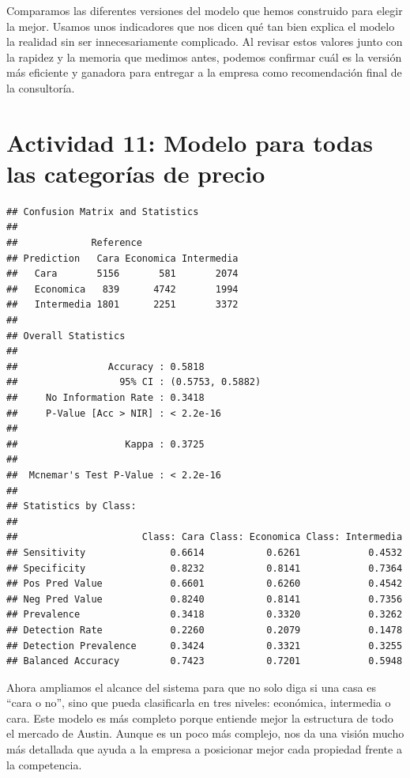 \documentclass[
]{article}
\begin{document}
Comparamos las diferentes versiones del modelo que hemos construido para
elegir la mejor. Usamos unos indicadores que nos dicen qué tan bien
explica el modelo la realidad sin ser innecesariamente complicado. Al
revisar estos valores junto con la rapidez y la memoria que medimos
antes, podemos confirmar cuál es la versión más eficiente y ganadora
para entregar a la empresa como recomendación final de la consultoría.

\section{Actividad 11: Modelo para todas las categorías de
precio}\label{actividad-11-modelo-para-todas-las-categoruxedas-de-precio}

\begin{verbatim}
## Confusion Matrix and Statistics
## 
##             Reference
## Prediction   Cara Economica Intermedia
##   Cara       5156       581       2074
##   Economica   839      4742       1994
##   Intermedia 1801      2251       3372
## 
## Overall Statistics
##                                           
##                Accuracy : 0.5818          
##                  95% CI : (0.5753, 0.5882)
##     No Information Rate : 0.3418          
##     P-Value [Acc > NIR] : < 2.2e-16       
##                                           
##                   Kappa : 0.3725          
##                                           
##  Mcnemar's Test P-Value : < 2.2e-16       
## 
## Statistics by Class:
## 
##                      Class: Cara Class: Economica Class: Intermedia
## Sensitivity               0.6614           0.6261            0.4532
## Specificity               0.8232           0.8141            0.7364
## Pos Pred Value            0.6601           0.6260            0.4542
## Neg Pred Value            0.8240           0.8141            0.7356
## Prevalence                0.3418           0.3320            0.3262
## Detection Rate            0.2260           0.2079            0.1478
## Detection Prevalence      0.3424           0.3321            0.3255
## Balanced Accuracy         0.7423           0.7201            0.5948
\end{verbatim}

Ahora ampliamos el alcance del sistema para que no solo diga si una casa
es ``cara o no'', sino que pueda clasificarla en tres niveles:
económica, intermedia o cara. Este modelo es más completo porque
entiende mejor la estructura de todo el mercado de Austin. Aunque es un
poco más complejo, nos da una visión mucho más detallada que ayuda a la
empresa a posicionar mejor cada propiedad frente a la competencia.
\end{document}
